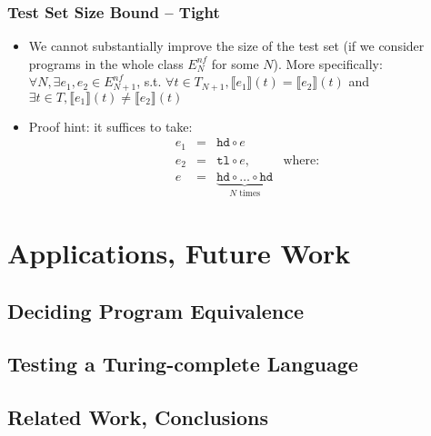 \documentclass{beamer}
\begin{document}
\begin{frame}
  \frametitle{Test Set Size Bound -- Tight}
  \begin{itemize}
    \item We cannot substantially improve the size of the test set 
    (if we consider programs in the whole class $E^{nf}_N$ for some $N$).
    More specifically: 
    $\forall N, \exists e_1, e_2 \in E^{nf}_{N+1}$, s.t.
    $\forall t \in T_{N+1}, \llbracket e_1 \rrbracket (t) = \llbracket e_2 \rrbracket (t)$ and
    $\exists t \in T, \llbracket e_1 \rrbracket (t) \neq \llbracket e_2 \rrbracket (t)$
	\item Proof hint: it suffices to take:
	  \[\begin{array}{lclr}
	  e_1 & = & \texttt{hd} \circ e & \\
	  e_2 & = & \texttt{tl} \circ e, & \text{where:} \\
	  e & = & \underbrace{\texttt{hd} \circ \ldots \circ \texttt{hd}}_{N \text{ times}}
	  \end{array}
	  \]      
  \end{itemize}
\end{frame}

\section{Applications, Future Work}

\subsection{Deciding Program Equivalence}


\subsection{Testing a Turing-complete Language}

\subsection{Related Work, Conclusions} %
\end{document}
